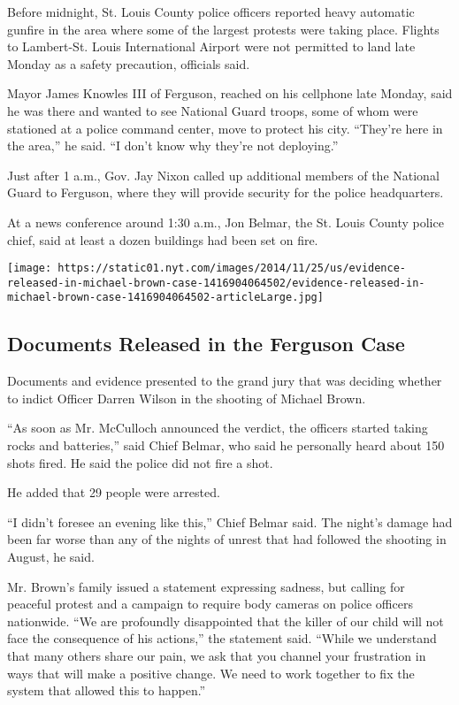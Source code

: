Before midnight, St. Louis County police officers reported heavy
automatic gunfire in the area where some of the largest protests were
taking place. Flights to Lambert-St. Louis International Airport were
not permitted to land late Monday as a safety precaution, officials
said.

Mayor James Knowles III of Ferguson, reached on his cellphone late
Monday, said he was there and wanted to see National Guard troops, some
of whom were stationed at a police command center, move to protect his
city. ``They're here in the area,'' he said. ``I don't know why they're
not deploying.''

Just after 1 a.m., Gov. Jay Nixon called up additional members of the
National Guard to Ferguson, where they will provide security for the
police headquarters.

At a news conference around 1:30 a.m., Jon Belmar, the St. Louis County
police chief, said at least a dozen buildings had been set on fire.

\href{https://www.nytimes.com/interactive/2014/11/25/us/evidence-released-in-michael-brown-case.html}{}

\texttt{[image: https://static01.nyt.com/images/2014/11/25/us/evidence-released-in-michael-brown-case-1416904064502/evidence-released-in-michael-brown-case-1416904064502-articleLarge.jpg]}

\hypertarget{documents-released-in-the-ferguson-case}{%
\subsection{Documents Released in the Ferguson
Case}\label{documents-released-in-the-ferguson-case}}

Documents and evidence presented to the grand jury that was deciding
whether to indict Officer Darren Wilson in the shooting of Michael
Brown.

``As soon as Mr. McCulloch announced the verdict, the officers started
taking rocks and batteries,'' said Chief Belmar, who said he personally
heard about 150 shots fired. He said the police did not fire a shot.

He added that 29 people were arrested.

``I didn't foresee an evening like this,'' Chief Belmar said. The
night's damage had been far worse than any of the nights of unrest that
had followed the shooting in August, he said.

Mr. Brown's family issued a statement expressing sadness, but calling
for peaceful protest and a campaign to require body cameras on police
officers nationwide. ``We are profoundly disappointed that the killer of
our child will not face the consequence of his actions,'' the statement
said. ``While we understand that many others share our pain, we ask that
you channel your frustration in ways that will make a positive change.
We need to work together to fix the system that allowed this to
happen.''

